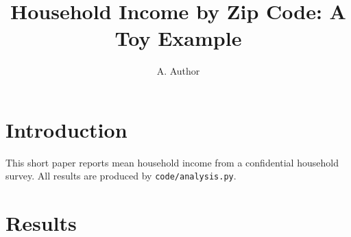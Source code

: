 \documentclass{article}
\title{Household Income by Zip Code: A Toy Example}
\author{A. Author}
\begin{document}
\maketitle

\section{Introduction}

This short paper reports mean household income from a confidential
household survey. All results are produced by \texttt{code/analysis.py}.

\section{Results}

\begin{table}[h]
\centering

\caption{Mean household income}
\label{tab:main}
\end{table}
\end{document}
